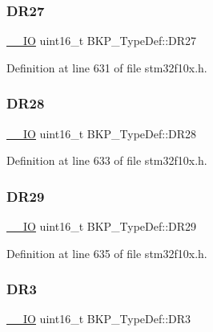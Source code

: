 \subsubsection{\texorpdfstring{D\+R27}{DR27}}
{\footnotesize\ttfamily \hyperlink{core__sc300_8h_aec43007d9998a0a0e01faede4133d6be}{\+\_\+\+\_\+\+IO} uint16\+\_\+t B\+K\+P\+\_\+\+Type\+Def\+::\+D\+R27}



Definition at line 631 of file stm32f10x.\+h.

\mbox{\label{struct_b_k_p___type_def_a741b11fc49b1b78afeb0585844b1f12d}} 
\subsubsection{\texorpdfstring{D\+R28}{DR28}}
{\footnotesize\ttfamily \hyperlink{core__sc300_8h_aec43007d9998a0a0e01faede4133d6be}{\+\_\+\+\_\+\+IO} uint16\+\_\+t B\+K\+P\+\_\+\+Type\+Def\+::\+D\+R28}



Definition at line 633 of file stm32f10x.\+h.

\mbox{\label{struct_b_k_p___type_def_a39b3d425209555dfe74c0b51c565115d}} 
\subsubsection{\texorpdfstring{D\+R29}{DR29}}
{\footnotesize\ttfamily \hyperlink{core__sc300_8h_aec43007d9998a0a0e01faede4133d6be}{\+\_\+\+\_\+\+IO} uint16\+\_\+t B\+K\+P\+\_\+\+Type\+Def\+::\+D\+R29}



Definition at line 635 of file stm32f10x.\+h.

\mbox{\label{struct_b_k_p___type_def_a034cf532a9752513de879c0f4ff38d0a}} 
\subsubsection{\texorpdfstring{D\+R3}{DR3}}
{\footnotesize\ttfamily \hyperlink{core__sc300_8h_aec43007d9998a0a0e01faede4133d6be}{\+\_\+\+\_\+\+IO} uint16\+\_\+t B\+K\+P\+\_\+\+Type\+Def\+::\+D\+R3}



